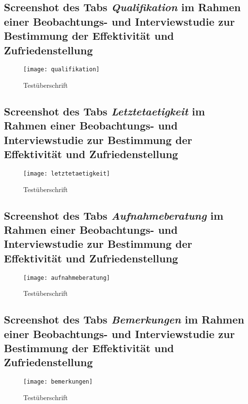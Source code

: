 \begin{landscape}
    \subsection{Screenshot des Tabs \textit{Qualifikation} im Rahmen einer Beobachtungs- und Interviewstudie zur Bestimmung der Effektivität und Zufriedenstellung}
    \label{section-qualifikation}
    \begin{figure}[H]
        \centering
        \caption{Testüberschrift}
        \begin{adjustbox}{width=\linewidth, center}
            \texttt{[image: qualifikation]}
        \end{adjustbox}
    \end{figure}

    \subsection{Screenshot des Tabs \textit{Letztetaetigkeit} im Rahmen einer Beobachtungs- und Interviewstudie zur Bestimmung der Effektivität und Zufriedenstellung}
    \label{section-letztetaetigkeit}
    \begin{figure}[H]
        \centering
        \caption{Testüberschrift}
        \begin{adjustbox}{width=\linewidth, center}
            \texttt{[image: letztetaetigkeit]}
        \end{adjustbox}
    \end{figure}

    \subsection{Screenshot des Tabs \textit{Aufnahmeberatung} im Rahmen einer Beobachtungs- und Interviewstudie zur Bestimmung der Effektivität und Zufriedenstellung}
    \label{section-aufnahmeberatung}
    \begin{figure}[H]
        \centering
        \caption{Testüberschrift}
        \begin{adjustbox}{width=\linewidth, center}
            \texttt{[image: aufnahmeberatung]}
        \end{adjustbox}
    \end{figure}

    \subsection{Screenshot des Tabs \textit{Bemerkungen} im Rahmen einer Beobachtungs- und Interviewstudie zur Bestimmung der Effektivität und Zufriedenstellung}
    \label{section-bemerkungen}
    \begin{figure}[H]
        \centering
        \caption{Testüberschrift}
        \begin{adjustbox}{width=\linewidth, center}
            \texttt{[image: bemerkungen]}
        \end{adjustbox}
    \end{figure}


\end{landscape}
